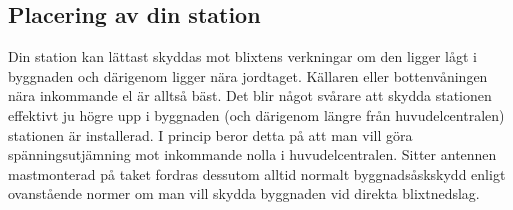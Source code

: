 
\subsection{Placering av din station}
Din station kan lättast skyddas mot blixtens verkningar om den ligger lågt i
byggnaden och därigenom ligger nära jordtaget.
Källaren eller bottenvåningen nära inkommande el är alltså bäst.
Det blir något svårare att skydda stationen effektivt ju högre upp i byggnaden
(och därigenom längre från huvudelcentralen) stationen är installerad.
I princip beror detta på att man vill göra spänningsutjämning mot inkommande
nolla i huvudelcentralen. Sitter antennen mastmonterad på taket fordras dessutom
alltid normalt byggnadsåskskydd enligt ovanstående normer om man vill skydda
byggnaden vid direkta blixtnedslag.

